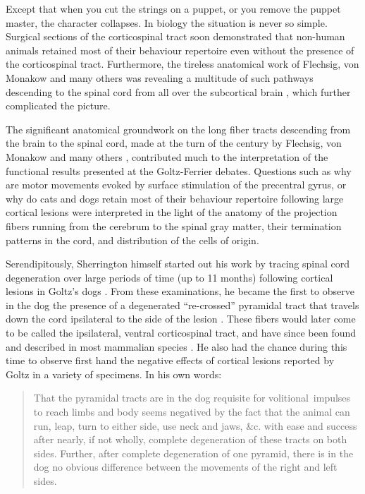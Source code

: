 Except that when you cut the strings on a puppet, or you remove the puppet master, the character collapses. In biology the situation is never so simple. Surgical sections of the corticospinal tract soon demonstrated that non-human animals retained most of their behaviour repertoire even without the presence of the corticospinal tract. Furthermore, the tireless anatomical work of Flechsig, von Monakow and many others was revealing a multitude of such pathways descending to the spinal cord from all over the subcortical brain \cite{Nathan1955}, which further complicated the picture.

The significant anatomical groundwork on the long fiber tracts descending from the brain to the spinal cord, made at the turn of the century by Flechsig, von Monakow and many others \cite{Nathan1955}, contributed much to the interpretation of the functional results presented at the Goltz-Ferrier debates. Questions such as why are motor movements evoked by surface stimulation of the precentral gyrus, or why do cats and dogs retain most of their behaviour repertoire following large cortical lesions were interpreted in the light of the anatomy of the projection fibers running from the cerebrum to the spinal gray matter, their termination patterns in the cord, and distribution of the cells of origin.

Serendipitously, Sherrington himself started out his work by tracing spinal cord degeneration over large periods of time (up to 11 months) following cortical lesions in Goltz's dogs \cite{Langley1884,Sherrington1885}. From these examinations, he became the first to observe in the dog the presence of a degenerated ``re-crossed'' pyramidal tract that travels down the cord ipsilateral to the side of the lesion \cite{Sherrington1885}. These fibers would later come to be called the ipsilateral, ventral corticospinal tract, and have since been found and described in most mammalian species \cite{Kuypers1981,Brosamle2000,Lacroix2004}. He also had the chance during this time to observe first hand the negative effects of cortical lesions reported by Goltz in a variety of specimens. In his own words:

\blockquote[{\protect\cite[p.189]{Sherrington1885}}]{That the pyramidal tracts are in the dog requisite for volitional~impulses to reach limbs and body seems negatived by the fact that the animal can run, leap, turn to either side, use neck and jaws, \&c. with ease and success after nearly, if not wholly, complete degeneration of these tracts on both sides. Further, after complete degeneration of one pyramid, there is in the dog no obvious difference between the movements of the right and left sides.}

